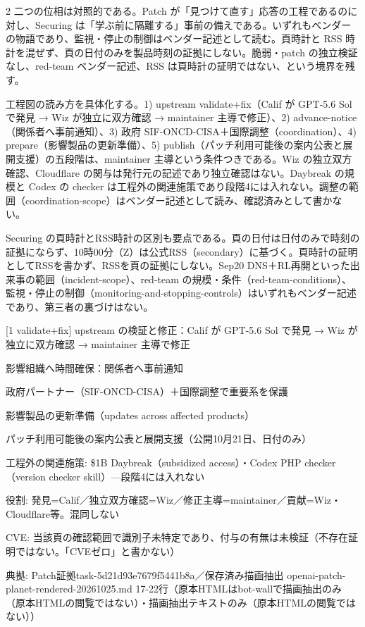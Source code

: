 \documentclass[lualatex,a4paper,10pt]{jlreq}
\begin{document}
\begin{multicols}{2}
二つの位相は対照的である。Patch が「見つけて直す」応答の工程であるのに対し、Securing は「学ぶ前に隔離する」事前の備えである。いずれもベンダーの物語であり、監視・停止の制御はベンダー記述として読む。頁時計と RSS 時計を混ぜず、頁の日付のみを製品時刻の証拠にしない。脆弱・patch の独立検証なし、red-team ベンダー記述、RSS は頁時計の証明ではない、という境界を残す。


工程図の読み方を具体化する。1) upstream validate+fix（Calif が GPT-5.6 Sol で発見 → Wiz が独立に双方確認 → maintainer 主導で修正）、2) advance-notice（関係者へ事前通知）、3) 政府 SIF-ONCD-CISA＋国際調整（coordination）、4) prepare（影響製品の更新準備）、5) publish（パッチ利用可能後の案内公表と展開支援）の五段階は、maintainer 主導という条件つきである。Wiz の独立双方確認、Cloudflare の関与は発行元の記述であり独立確認はない。Daybreak の規模と Codex の checker は工程外の関連施策であり段階4には入れない。調整の範囲（coordination-scope）はベンダー記述として読み、確認済みとして書かない。


Securing の頁時計とRSS時計の区別も要点である。頁の日付は日付のみで時刻の証拠にならず、10時00分（Z）は公式RSS（secondary）に基づく。頁時計の証明としてRSSを書かず、RSSを頁の証拠にしない。Sep20 DNS＋RL再開といった出来事の範囲（incident-scope）、red-team の規模・条件（red-team-conditions）、監視・停止の制御（monitoring-and-stopping-controls）はいずれもベンダー記述であり、第三者の裏づけはない。


\end{multicols} %
{\centering
\begin{tcolorbox}[colback=SurveySoft,colframe=SurveyAccent,arc=1mm,boxrule=0.4pt,left=2mm,right=2mm,title={協調開示の五段階}]
{\footnotesize 
[1 validate+fix] upstream の検証と修正：Calif が GPT-5.6 Sol で発見 → Wiz が独立に双方確認 → maintainer 主導で修正\par
[2 advance-notice] 影響組織へ時間確保：関係者へ事前通知\par
[3 coordination] 政府パートナー（SIF-ONCD-CISA）＋国際調整で重要系を保護\par
[4 prepare] 影響製品の更新準備（updates across affected products）\par
[5 publish] パッチ利用可能後の案内公表と展開支援（公開10月21日、日付のみ）\par
工程外の関連施策: \$1B Daybreak（subsidized access）・Codex PHP checker（version checker skill）—段階4には入れない\par
役割: 発見=Calif／独立双方確認=Wiz／修正主導=maintainer／貢献=Wiz・Cloudflare等。混同しない\par
CVE: 当該頁の確認範囲で識別子未特定であり、付与の有無は未検証（不存在証明ではない。「CVEゼロ」と書かない）\par
典拠: Patch証拠task-5d21d93e7679f5441b8a／保存済み描画抽出 openai-patch-planet-rendered-20261025.md 17-22行（原本HTMLはbot-wallで描画抽出のみ（原本HTMLの閲覧ではない）・描画抽出テキストのみ（原本HTMLの閲覧ではない））\par
\par}
\end{tcolorbox}
} %
\end{document}
